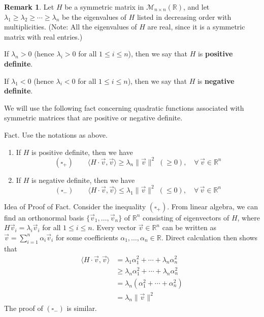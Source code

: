 \documentclass[11pt]{article}
\theoremstyle{definition}
\newtheorem{remark}[thm]{Remark}
\newcommand{\R}{\ensuremath{\mathbb{R}}}
\begin{document}
\begin{remark}
Let $H$ be a symmetric matrix in $\mathcal{M}_{n \times n}(\R)$, and let $\lambda_1 \geq \lambda_2 \geq \cdots \geq \lambda_n$ be the eigenvalues of $H$ listed in decreasing order with multiplicities. (Note: All the eigenvalues of $H$ are real, since it is a symmetric matrix with real entries.)

If $\lambda_n > 0$ (hence $\lambda_i > 0$ for all $1 \leq i \leq n$), then we say that $H$ is {\bf positive definite}.

If $\lambda_1 < 0$ (hence $\lambda_i < 0$ for all $1 \leq i \leq n$), then we say that $H$ is {\bf negative definite}.

We will use the following fact concerning quadratic functions associated with symmetric matrices that are positive or negative definite.

{\sc Fact.} Use the notations as above.\vspace{-1.5ex}
\begin{enumerate}[(1)]
\item If $H$ is positive definite, then we have
$$(\square_+) \qquad \langle H \cdot \vec{v}, \vec{v} \rangle \geq \lambda_n \|\vec{v}\|^2 \; (\geq 0), \quad \forall\,\vec{v} \in \R^n$$
\item If $H$ is negative definite, then we have
$$(\square_-) \qquad \langle H \cdot \vec{v}, \vec{v} \rangle \leq \lambda_1 \|\vec{v}\|^2 \; (\leq 0), \quad \forall\,\vec{v} \in \R^n$$
\end{enumerate}
\vspace{-1.5ex}
{\sc Idea of Proof of Fact.} Consider the inequality $(\square_+)$. From linear algebra, we can find an orthonormal basis $\{\vec{v}_1, \dots, \vec{v}_n\}$ of $\R^n$ consisting of eigenvectors of $H$, where $H \vec{v}_i = \lambda_i \vec{v}_i$ for all $1 \leq i \leq n$. Every vector $\vec{v} \in \R^n$ can be written as $\vec{v} = \sum_{i=1}^n \alpha_i\vec{v}_i$ for some coefficients $\alpha_1, \dots, \alpha_n \in \R$. Direct calculation then shows that
\begin{align*}
    \langle H \cdot \vec{v}, \vec{v} \rangle
    &= \lambda_1 \alpha_1^2 + \cdots + \lambda_n \alpha_n^2 \\
    &\geq \lambda_n \alpha_1^2 + \cdots + \lambda_n \alpha_n^2 \\
    &= \lambda_n (\alpha_1^2 + \cdots + \alpha_n^2) \\
    &= \lambda_n \|\vec{v}\|^2
\end{align*}
The proof of $(\square_-)$ is similar.
\end{remark}
\end{document}
